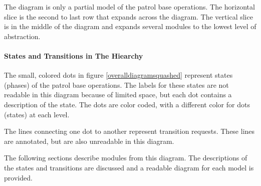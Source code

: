 \documentclass[../../main/main.tex]{subfiles}
\begin{document}
The diagram is only a partial model of the patrol base operations.  The horizontal slice is the second to last row that expands across the diagram.  The vertical slice is in the middle of the diagram and expands several modules to the lowest level of abstraction.  

\paragraph*{States and Transitions in The Hiearchy}
The small, colored dots in figure \ref{overalldiagramsquashed} represent states (phases) of the patrol base operations.   The labels for these states are not readable in this diagram because of limited space, but each dot contains a description of the state.  The dots are color coded, with a different color for dots (states) at each level. 
%

The lines connecting one dot to another represent transition requests.  These lines are annotated, but are also unreadable in this diagram. 

The following sections describe modules from this diagram.  The descriptions of the states and transitions are discussed and a readable diagram for each model is provided.  


%
%
\end{document}
